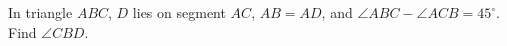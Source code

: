 In triangle $ABC$, $D$ lies on segment $AC$, $AB=AD$, and $\angle ABC-\angle ACB=45^\circ$. Find $\angle CBD$.

